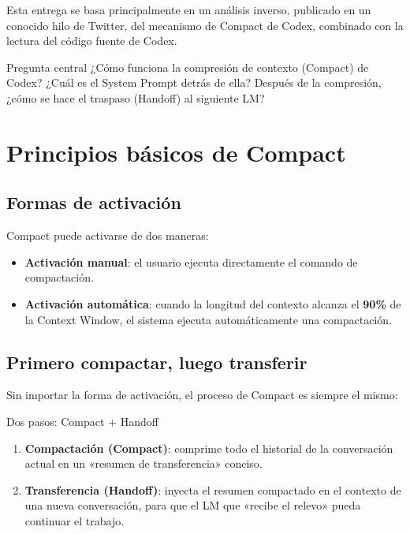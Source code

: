 \documentclass[a4paper]{article}
\begin{document}
Esta entrega se basa principalmente en un análisis inverso, publicado en un conocido hilo de Twitter, del mecanismo de Compact de Codex, combinado con la lectura del código fuente de Codex.

\begin{knowledgebox}{Pregunta central}
¿Cómo funciona la compresión de contexto (Compact) de Codex? ¿Cuál es el System Prompt detrás de ella? Después de la compresión, ¿cómo se hace el traspaso (Handoff) al siguiente LM?
\end{knowledgebox}

\section{Principios básicos de Compact}

\subsection{Formas de activación}

Compact puede activarse de dos maneras:

\begin{itemize}
    \item \textbf{Activación manual}: el usuario ejecuta directamente el comando de compactación.
    \item \textbf{Activación automática}: cuando la longitud del contexto alcanza el \textbf{90\%} de la Context Window, el sistema ejecuta automáticamente una compactación.
\end{itemize}

\subsection{Primero compactar, luego transferir}

Sin importar la forma de activación, el proceso de Compact es siempre el mismo:

\begin{importantbox}{Dos pasos: Compact + Handoff}
\begin{enumerate}
    \item \textbf{Compactación (Compact)}: comprime todo el historial de la conversación actual en un «resumen de transferencia» conciso.
    \item \textbf{Transferencia (Handoff)}: inyecta el resumen compactado en el contexto de una nueva conversación, para que el LM que «recibe el relevo» pueda continuar el trabajo.
\end{enumerate}
\end{importantbox}
\end{document}
